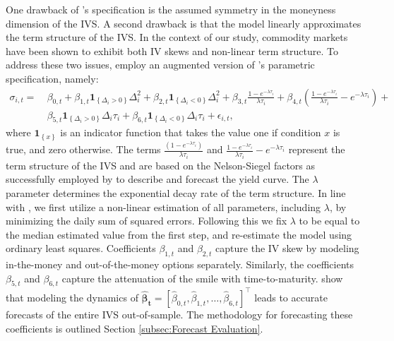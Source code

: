 \documentclass[12pt,a4paper]{article}
\newcommand\possessivecite[1]{\citeauthor{#1}'s \citeyearpar{#1}}
\begin{document}
One drawback of \possessivecite{goncalves2006predictable} specification is the assumed symmetry in the moneyness dimension of the IVS. A second drawback is that the model linearly approximates the term structure of the IVS. In the context of our study, commodity markets have been shown to exhibit both IV skews and non-linear term structure. To address these two issues, \cite{chalamandaris2011important} employ an augmented version of \possessivecite{dumas1998implied} parametric specification, namely:
\begin{align*}
\sigma_{i,t}=\ &\beta_{0,t}+\beta_{1,t}\mathbf{1}_{\left\{ \Delta_{i}>0\right\} }\Delta_{i}^{2}+\beta_{2,t}\mathbf{1}_{\left\{ \Delta_{i}<0\right\} }\Delta_{i}^{2}+\beta_{3,t}\frac{1-e^{-\lambda\tau_{i}}}{\lambda\tau_{i}}+\beta_{4,t}\left(\frac{1-e^{-\lambda\tau_{i}}}{\lambda\tau_{i}}-e^{-\lambda\tau_{i}}\right)+
\\
&\beta_{5,t}\mathbf{1}_{\left\{ \Delta_{i}>0\right\} }\Delta_{i}\tau_{i}+\beta_{6,t}\mathbf{1}_{\left\{ \Delta_{i}<0\right\} }\Delta_{i}\tau_{i}+\epsilon_{i,t},
\end{align*}
where $\mathbf{1}_{\left\{ x\right\} }$ is an indicator function that takes the value one if condition $x$ is true, and zero otherwise. The terms $\tfrac{(1-e^{-\lambda\tau_{i}})}{\lambda\tau_{i}}$ and $\frac{1-e^{-\lambda\tau_{i}}}{\lambda\tau_{i}}-e^{-\lambda\tau_{i}}$ represent the term structure of the IVS and are based on the Nelson-Siegel factors as successfully employed by \cite{diebold2006forecasting} to describe and forecast the yield curve. The $\lambda$ parameter determines the exponential decay rate of the term structure. In line with \cite{diebold2006forecasting}, we first utilize a non-linear estimation of all parameters, including $\lambda$, by minimizing the daily sum of squared errors. Following this we fix $\lambda$ to be equal to the median estimated value from the first step, and re-estimate the model using ordinary least squares. Coefficients $\beta_{1,t}$ and $\beta_{2,t}$ capture the IV skew by modeling in-the-money and out-of-the-money options separately. Similarly, the coefficients $\beta_{5,t}$ and $\beta_{6,t}$ capture the attenuation of the smile with time-to-maturity. \cite{chalamandaris2011important} show that modeling the dynamics of $\boldsymbol{\widehat{\beta}_{t}}=\left[\widehat{\beta}_{0,t},\widehat{\beta}_{1,t},\ldots,\widehat{\beta}_{6,t}\right]^{\top}$ leads to accurate forecasts of the entire IVS out-of-sample. The methodology for forecasting these coefficients is outlined Section \ref{subsec:Forecast Evaluation}.
\end{document}
